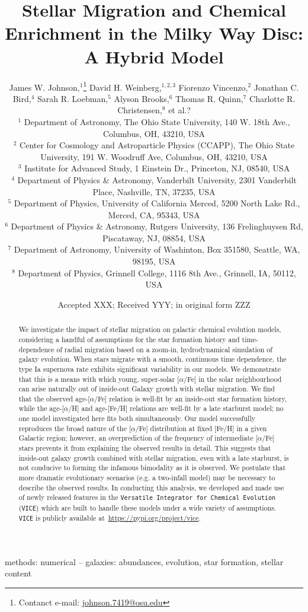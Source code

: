 \documentclass[fleqn, usenatbib]{mnras}
\title[Stellar Migration and Chemical Enrichment]{Stellar Migration and 
Chemical Enrichment in the Milky Way Disc: A Hybrid Model}
\author[J.W. Johnson et al.]{
	James W. Johnson,$^{1}$\thanks{Contanct e-mail: \href{mailto:
	johnson.7419@osu.edu}{johnson.7419@osu.edu}} 
	David H. Weinberg,$^{1, 2, 3}$ 
	Fiorenzo Vincenzo,$^{2}$ 
	Jonathan C. Bird,$^{4}$ 
	\newauthor 
	Sarah R. Loebman,$^{5}$ 
	Alyson Brooks,$^{6}$ 
	Thomas R. Quinn,$^{7}$ 
	Charlotte R. Christensen,$^{8}$ 
	\newauthor 
	et al.?
	\\
	$^{1}$ Department of Astronomy, The Ohio State University, 
	140 W. 18th Ave., Columbus, OH, 43210, USA 
	\\ 
	$^{2}$ Center for Cosmology and Astroparticle Physics (CCAPP), 
	The Ohio State University, 191 W. Woodruff Ave, Columbus, OH, 43210, USA 
	\\ 
	$^{3}$ Institute for Advanced Study, 1 Einstein Dr., Princeton, NJ, 08540, 
	USA 
	\\ 
	$^{4}$ Department of Physics \& Astronomy, Vanderbilt University, 
	2301 Vanderbilt Place, Nashville, TN, 37235, USA 
	\\ 
	$^{5}$ Department of Physics, University of California Merced, 
	5200 North Lake Rd., Merced, CA, 95343, USA 
	\\ 
	$^{6}$ Department of Physics \& Astronomy, Rutgers University, 136 
	Frelinghuysen Rd, Piscataway, NJ, 08854, USA 
	\\ 
	$^{7}$ Department of Astronomy, University of Washinton, Box 351580, 
	Seattle, WA, 98195, USA 
	\\ 
	$^{8}$ Department of Physics, Grinnell College, 1116 8th Ave., Grinnell, 
	IA, 50112, USA 
}
\date{Accepted XXX; Received YYY; in original form ZZZ}
\begin{document}
 
\label{firstpage} 
\pagerange{\pageref{firstpage}--\pageref{lastpage}} 
\maketitle 

\begin{abstract} 
We investigate the impact of stellar migration on galactic chemical evolution 
models, considering a handful of assumptions for the star formation history 
and time-dependence of radial migration based on a zoom-in, hydrodynamical 
simulation of galaxy evolution. When stars migrate with a smooth, continuous 
time dependence, the type Ia supernova rate exhibits significant variability in 
our models. We demonstrate that this is a means with which young, super-solar 
[$\alpha$/Fe] in the solar neighbourhood can arise naturally out of inside-out 
Galaxy growth with stellar migration. We find 
that the observed age-[$\alpha$/Fe] relation is well-fit by an inside-out star 
formation history, while the age-[$\alpha$/H] and age-[Fe/H] relations are 
well-fit by a late starburst model; no one model investigated here fits both 
simultaneously. Our model successfully reproduces the broad nature of the 
[$\alpha$/Fe] distribution at fixed [Fe/H] in a given Galactic region; however, 
an overprediction of the frequency of intermediate [$\alpha$/Fe] stars prevents 
it from explaining the observed results in detail. This suggests 
that inside-out galaxy growth combined with stellar migration, even with a late 
starburst, is not conducive to forming the infamous bimodality as it is 
observed. We postulate that more dramatic evolutionary scenarios (e.g. a 
two-infall model) may be necessary to describe the observed results. In 
conducting this analysis, we developed and made use of newly released features 
in the \texttt{Versatile Integrator for Chemical Evolution} (\texttt{VICE}) 
which are built to handle these models under a wide variety of 
assumptions. \texttt{VICE} is publicly available 
at~\url{https://pypi.org/project/vice}. 
\end{abstract} 

\begin{keywords} 
methods: numerical -- galaxies: abundances, evolution, star formation, stellar 
content 
\end{keywords}
\end{document}
